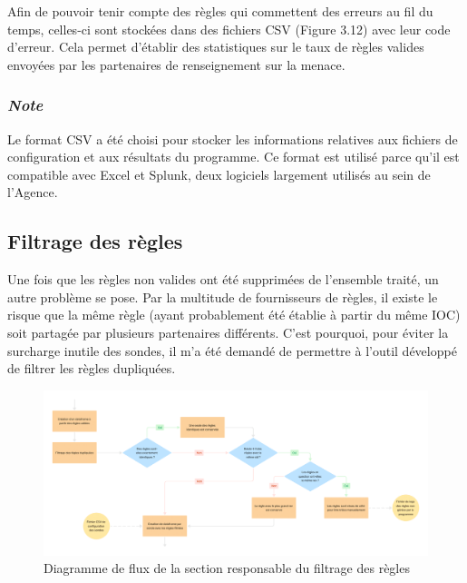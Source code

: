 \newpage

Afin de pouvoir tenir compte des règles qui commettent des erreurs au fil du temps, celles-ci sont stockées dans des fichiers CSV (Figure 3.12) avec leur code d'erreur. Cela permet d'établir des statistiques sur le taux de règles valides envoyées par les partenaires de renseignement sur la menace.\\

\subsubsection{\textit{Note}}
Le format CSV a été choisi pour stocker les informations relatives aux fichiers de configuration et aux résultats du programme. Ce format est utilisé parce qu'il est compatible avec Excel et Splunk, deux logiciels largement utilisés au sein de l'Agence.

\newpage

\subsection{Filtrage des règles}

\vspace{1em}

Une fois que les règles non valides ont été supprimées de l'ensemble traité, un autre problème se pose. Par la multitude de fournisseurs de règles, il existe le risque que la même règle (ayant probablement été établie à partir du même IOC) soit partagée par plusieurs partenaires différents. C'est pourquoi, pour éviter la surcharge inutile des sondes, il m'a été demandé de permettre à l'outil développé de filtrer les règles dupliquées.\\

\begin{figure}[h]%
    \center%
    \includegraphics[width=1\textwidth]{assets/diagrameFlux3-3.png}
    \caption[Diagramme de flux de la section responsable du filtrage des règles]{Diagramme de flux de la section responsable du filtrage des règles}\label{fig:diagrameFlux3-3}
\end{figure}

